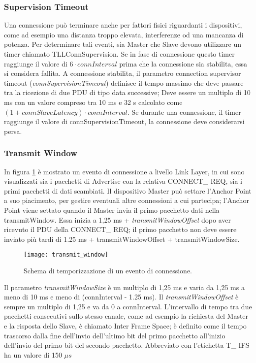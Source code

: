 \subsubsection{Supervision Timeout}\label{timeout}
Una connessione può terminare anche per fattori fisici riguardanti i dispositivi, come ad esempio una distanza troppo elevata, interferenze od una mancanza di potenza. Per determinare tali eventi, sia Master che Slave devono utilizzare un timer chiamato TLLConnSupervision. 
Se in fase di connessione questo timer raggiunge il valore di $6 \cdot connInterval$ prima che la connessione sia stabilita, essa si considera fallita.
A connessione stabilita, il parametro connection supervisor timeout (\emph{connSupervisionTimeout}) definisce il tempo massimo che deve passare tra la ricezione di due PDU di tipo data successive; Deve essere un multiplo di 10 ms con un valore compreso tra 10 ms e 32 s calcolato come $(1 + connSlaveLatency) \cdot connInterval$.
Se durante una connessione, il timer raggiunge il valore di connSupervisionTimeout, la connessione deve considerarsi persa.

\subsubsection{Transmit Window}
In figura \ref{transmit_window} è mostrato un evento di connessione a livello Link Layer, in cui sono visualizzati sia i pacchetti di Advertise con la relativa CONNECT\_ REQ, sia i primi pacchetti di dati scambiati. Il dispositivo Master può settare l'Anchor Point a suo piacimento, per gestire eventuali altre connessioni a cui partecipa; l'Anchor Point viene settato quando il Master invia il primo pacchetto dati nella transmitWindow. Essa inizia a 1,25 ms + \emph{transmitWindowOffset} dopo aver ricevuto il PDU della CONNECT\_ REQ; il primo pacchetto non deve essere inviato più tardi di 1.25 ms + transmitWindowOffset + transmitWindowSize.

\begin{figure}[H]
\texttt{[image: transmit\_window]}
\centering
\caption{Schema di temporizzazione di un evento di connessione. }
\label{transmit_window}
\end{figure}

Il parametro \emph{transmitWindowSize} è un multiplo di 1,25 ms e varia da 1,25 ms a meno di 10 ms e meno di (connInterval - 1.25 ms). Il \emph{transmitWindowOffset} è sempre un multiplo di 1,25 e va da 0 a connInterval.
L'intervallo di tempo tra due pacchetti consecutivi sullo stesso canale, come ad esempio la richiesta del Master e la risposta dello Slave, è chiamato Inter Frame Space; è definito come il tempo trascorso dalla fine dell'invio dell'ultimo bit del primo pacchetto all'inizio dell'invio del primo bit del secondo pacchetto. Abbreviato con l'etichetta T\_ IFS ha un valore di 150 $\mu s$

